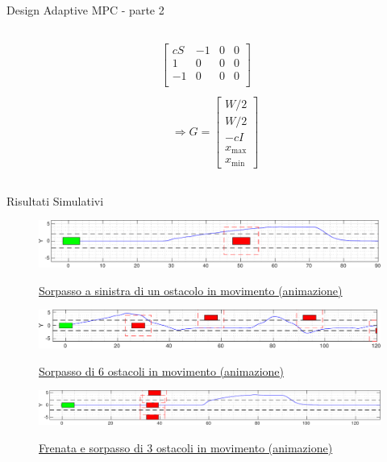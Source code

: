 \documentclass{beamer}
\renewcommand{\vec}[1]{\ensuremath{\boldsymbol{\mathit{#1}}}}
\begin{document}
\begin{frame}{Design Adaptive MPC - parte 2}
\begin{columns}[onlytextwidth,T]
\begin{column}[c]{0.34\textwidth}
\begin{equation*}
\begin{array}{lll}
\begin{bmatrix}
				cS&-1&0&0\\
				1&0&0&0\\
				-1&0&0&0\\
				\end{bmatrix}\\\\
				\quad\Rightarrow\vec{G}=
				\begin{bmatrix}
				W/2\\W/2\\-cI\\x_{\max}\\x_{\min}
				\end{bmatrix}
				\end{array}
				\end{equation*}
			\end{column}
		\end{columns}
	\end{frame}
	
	\begin{frame}{Risultati Simulativi}
		\begin{figure}								
		\href{run:./video/animation_one_obstacle_left_overtaking.avi}{\includegraphics[width=\textwidth]{./images/one_obstacle_right_overtaking/overtaking_pres.pdf}}
		\caption{\href{run:./video/animation_one_obstacle_left_overtaking.avi}{Sorpasso a sinistra di un ostacolo in movimento (animazione)}}
		\label{fig:un_ostacolo}
		\vspace{-1.5em}
		\end{figure}
		\begin{figure}
		\href{run:./video/animation_6_obstacles.avi}{\includegraphics[width=\textwidth]{./images/6_obstacles/6_obstacles_pres.pdf}}
		\caption{\href{run:./video/animation_6_obstacles.avi}{Sorpasso di 6 ostacoli in movimento (animazione)}}
		\label{fig:sei_ostacoli}
		\vspace{-1.5em}
		\end{figure}
		\begin{figure}
		\href{run:./video/animation_braking_overtaking.avi}{\includegraphics[width=\textwidth]{./images/three_obstacles_no_overtaking/braking_pres.pdf}}
		\caption{\href{./video/animation_braking_overtaking.avi}{Frenata e sorpasso di 3 ostacoli in movimento (animazione)}}
		\label{fig:frenata}
		\end{figure}
	\end{frame}
	
\end{document}
